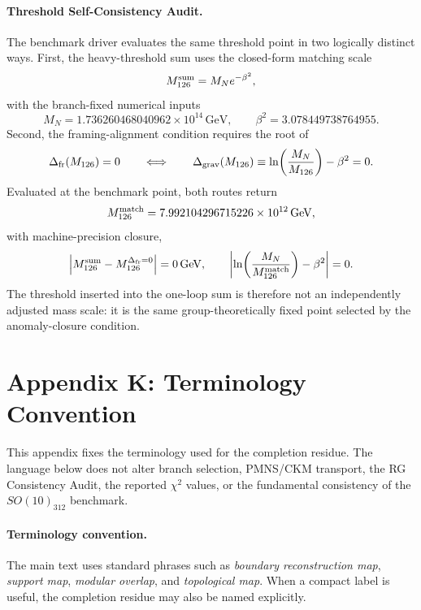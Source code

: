 \documentclass[11pt]{article}
\makeatletter
\newcommand{\manualappendixlabel}[2]{%
  \begingroup
  \def\@currentlabel{#1}%
  \label{#2}%
  \endgroup
}
\makeatother
\begin{document}
\paragraph{Threshold Self-Consistency Audit.}
The benchmark driver evaluates the same threshold point in two logically distinct ways. First, the heavy-threshold sum uses the closed-form matching scale
\begin{equation}
 M_{126}^{\rm sum}=M_Ne^{-\beta^2},
\end{equation}
with the branch-fixed numerical inputs
\begin{equation}
 M_N=1.736260468040962\times10^{14}\,\mathrm{GeV},
 \qquad
 \beta^2=3.078449738764955.
\end{equation}
Second, the framing-alignment condition requires the root of
\begin{equation}
 \Delta_{\rm fr}(M_{126})=0
 \qquad\Longleftrightarrow\qquad
 \Delta_{\rm grav}(M_{126})\equiv\ln\!\left(\frac{M_N}{M_{126}}\right)-\beta^2=0.
\end{equation}
Evaluated at the benchmark point, both routes return
\begin{equation}
 M_{126}^{\rm match}=7.992104296715226\times10^{12}\,\mathrm{GeV},
\end{equation}
with machine-precision closure,
\begin{equation}
 \left|M_{126}^{\rm sum}-M_{126}^{\Delta_{\rm fr}=0}\right|=0\,\mathrm{GeV},
 \qquad
 \left|\ln\!\left(\frac{M_N}{M_{126}^{\rm match}}\right)-\beta^2\right|=0.
\end{equation}
The threshold inserted into the one-loop sum is therefore not an independently adjusted mass scale: it is the same group-theoretically fixed point selected by the anomaly-closure condition.


\section*{Appendix K: Terminology Convention}\manualappendixlabel{K}{app:interpretive-mappings}

This appendix fixes the terminology used for the completion residue. The
language below does not alter branch selection, PMNS/CKM transport, the RG
Consistency Audit, the reported $\chi^2$ values, or the fundamental
consistency of the $SO(10)_{312}$ benchmark.

\paragraph{Terminology convention.}
The main text uses standard phrases such as \emph{boundary reconstruction map},
\emph{support map}, \emph{modular overlap}, and \emph{topological map}. When a
compact label is useful, the completion residue may also be named explicitly.
\end{document}

